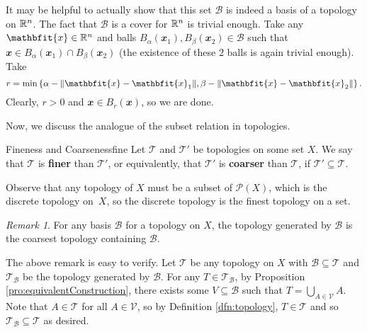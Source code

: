 \documentclass[math]{amznotes}
\theoremstyle{remark}
\newtheorem*{remark}{Remark}
\begin{document}
It may be helpful to actually show that this set $\mathcal{B}$ is indeed a basis of a topology on $\mathbb{R}^n$. The fact that $\mathcal{B}$ is a cover for $\mathbb{R}^n$ is trivial enough. Take any $\mathbfit{x} \in \R^n$ and balls $B_{\alpha}\left(\mathbfit{x}_1\right), B_{\beta}\left(\mathbfit{x}_2\right) \in \mathcal{B}$ such that $\mathbfit{x} \in B_{\alpha}\left(\mathbfit{x}_1\right) \cap B_{\beta}\left(\mathbfit{x}_2\right)$ (the existence of these $2$ balls is again trivial enough). Take 
\begin{equation*}
    r = \min\left\{\alpha - \norm{\mathbfit{x} - \mathbfit{x}_1}, \beta - \norm{\mathbfit{x} - \mathbfit{x}_2}\right\}.
\end{equation*}
Clearly, $r > 0$ and $\mathbfit{x} \in B_r\left(\mathbfit{x}\right)$, so we are done.

Now, we discuss the analogue of the subset relation in topologies.
\begin{dfnbox}{Fineness and Coarseness}{fine}
    Let $\mathcal{T}$ and $\mathcal{T}'$ be topologies on some set $X$. We say that $\mathcal{T}$ is {\color{red} \textbf{finer}} than $\mathcal{T}'$, or equivalently, that $\mathcal{T}'$ is {\color{red} \textbf{coarser}} than $\mathcal{T}$, if $\mathcal{T}' \subseteq \mathcal{T}$.
\end{dfnbox}
Observe that any topology of $X$ must be a subset of $\mathcal{P}\left(X\right)$, which is the discrete topology on~$X$, so the discrete topology is the finest topology on a set.
\begin{notebox}
    \begin{remark}
        For any basis $\mathcal{B}$ for a topology on $X$, the topology generated by $\mathcal{B}$ is the coarsest topology containing $\mathcal{B}$.
    \end{remark}
\end{notebox}
The above remark is easy to verify. Let $\mathcal{T}$ be any topology on $X$ with $\mathcal{B} \subseteq \mathcal{T}$ and $\mathcal{T}_{\mathcal{B}}$ be the topology generated by $\mathcal{B}$. For any $T \in \mathcal{T}_{\mathcal{B}}$, by Proposition \ref{pro:equivalentConstruction}, there exists some $V \subseteq \mathcal{B}$ such that $T = \bigcup_{A \in \mathcal{V}}A$. Note that $A \in \mathcal{T}$ for all $A \in \mathcal{V}$, so by Definition \ref{dfn:topology}, $T \in \mathcal{T}$ and so $\mathcal{T}_{\mathcal{B}} \subseteq \mathcal{T}$ as desired.
\end{document}
